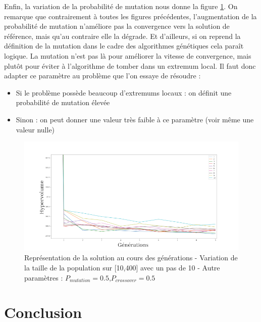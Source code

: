 \documentclass[12pt]{report}
\begin{document}
      Enfin, la variation de la probabilité de mutation nous donne la figure \ref{sch_mutation_moy}. On remarque que contrairement à toutes les figures précédentes, l'augmentation de la probabilité de mutation n'améliore pas la convergence vers la solution de référence, mais qu'au contraire elle la dégrade. Et d'ailleurs, si on reprend la définition de la mutation dans le cadre des algorithmes génétiques cela paraît logique. La mutation n'est pas là pour améliorer la vitesse de convergence, mais plutôt pour éviter à l'algorithme de tomber dans un extremum local.
      Il faut donc adapter ce paramètre au problème que l'on essaye de résoudre :
      \begin{itemize}
        \item Si le problème possède beaucoup d'extremums locaux : on définit une probabilité de mutation élevée
        \item Sinon : on peut donner une valeur très faible à ce paramètre (voir même une valeur nulle)
      \end{itemize}

      \begin{figure}[h]
        \centering
        \includegraphics[width=15cm]{img/DTLZ7_mutation.png}
        \caption{Représentation de la solution au cours des générations - Variation de la taille de la population sur [10,400] avec un pas de 10 - Autre paramètres : $P_{mutation} = 0.5$,$P_{crossover} = 0.5$}
        \label{sch_mutation_moy}
      \end{figure}



  \chapter{Conclusion}
\end{document}
